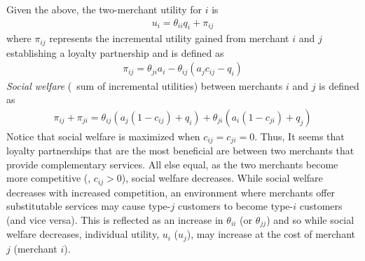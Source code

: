Given the above, the two-merchant utility for $i$ is
%
\begin{align*}
u_i = \theta_{ii}q_i + \pi_{ij}
\end{align*}
%
where $\pi_{ij}$ represents the incremental utility gained from merchant $i$ and $j$ establishing a loyalty partnership and is defined as
\begin{align*}
\pi_{ij} = \theta_{ji}a_i - \theta_{ij}(a_j c_{ij} - q_i)
\end{align*}
%
\textit{Social welfare} (\ie\ sum of incremental utilities) between merchants $i$ and $j$ is defined as
\begin{align*}
\pi_{ij} + \pi_{ji} = \theta_{ij}(a_j(1-c_{ij}) + q_i) + \theta_{ji}(a_i(1-c_{ji}) + q_j)
\end{align*}
Notice that social welfare is maximized when $c_{ij} = c_{ji} = 0$. Thus, It seems that loyalty partnerships that are the most beneficial are between two merchants that provide complementary services. All else equal, as the two merchants become more competitive (\ie, $c_{ij} > 0$), social welfare decreases. While social welfare decreases with increased competition, an environment where merchants offer substitutable services may cause type-$j$ customers to become type-$i$ customers (and vice versa). This is reflected as an increase in $\theta_{ii}$ (or $\theta_{jj}$) and so while social welfare decreases, individual utility, $u_i$ ($u_j$), may increase at the cost of merchant $j$ (merchant $i$). 

